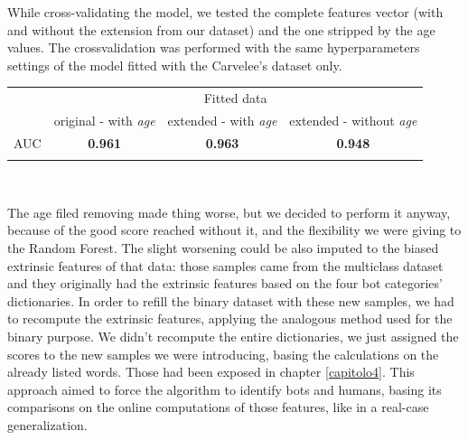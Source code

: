 While cross-validating the model, we tested the complete features vector (with and without the extension from our dataset) and the one stripped by the age values. The crossvalidation was performed with the same hyperparameters settings of the model fitted with the Carvelee's dataset only.

{
	\centering
	\begin{tabular}{@{}cccc@{}}
		\multicolumn{1}{c}{} & 
		\multicolumn{3}{c}{Fitted data} \\ 
		\cline{2-4}
		\multicolumn{1}{c|}{} & 
		\multicolumn{1}{c|}{original - with \textit{age} } & 
		\multicolumn{1}{c|}{extended - with \textit{age} } & 
		\multicolumn{1}{c|}{extended - without \textit{age}} \\
		\cline{1-4}
		\multicolumn{1}{|c|}{AUC} & 
		\multicolumn{1}{c|}{\textbf{0.961}} & 
		\multicolumn{1}{c|}{\textbf{0.963}} & 
		\multicolumn{1}{c|}{\textbf{0.948}} \\
		\cline{1-4}\\
	\end{tabular}\\
}

The age filed removing made thing worse, but we decided to perform it anyway, because of the good score reached without it, and the flexibility we were giving to the Random Forest. The slight worsening could be also imputed to the biased extrinsic features of that data: those samples came from the multiclass dataset and they originally had the extrinsic features based on the four bot categories' dictionaries.
In order to refill the binary dataset with these new samples, we had to recompute the extrinsic features, applying the analogous method used for the binary purpose.
We didn't recompute the entire dictionaries, we just assigned the scores to the new samples we were introducing, basing the calculations on the already listed words. Those had been exposed in chapter \ref{capitolo4}. This approach aimed to force the algorithm to identify bots and humans, basing its comparisons on the online computations of those features, like in a real-case generalization.

